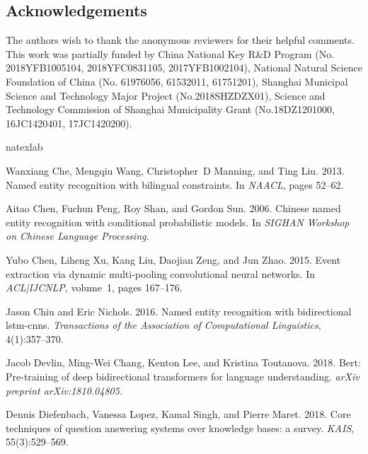 \documentclass[11pt,a4paper]{article}
\begin{document}
\begin{CJK}{UTF8}{gbsn}
\section*{Acknowledgements}
The authors wish to thank the anonymous reviewers for their helpful comments. This work was partially funded by China National Key R\&D Program (No. 2018YFB1005104, 2018YFC0831105, 2017YFB1002104), National Natural Science Foundation of China (No. 61976056, 61532011, 61751201), Shanghai Municipal Science and Technology Major Project (No.2018SHZDZX01), Science and Technology Commission of Shanghai Municipality Grant  (No.18DZ1201000, 16JC1420401, 17JC1420200).

\begin{thebibliography}{35}
\expandafter\ifx\csname natexlab\endcsname\relax\def\natexlab#1{#1}\fi

Wanxiang Che, Mengqiu Wang, Christopher~D Manning, and Ting Liu. 2013.
\newblock Named entity recognition with bilingual constraints.
\newblock In \emph{NAACL}, pages 52--62.

Aitao Chen, Fuchun Peng, Roy Shan, and Gordon Sun. 2006.
\newblock Chinese named entity recognition with conditional probabilistic
  models.
\newblock In \emph{SIGHAN Workshop on Chinese Language Processing}.

Yubo Chen, Liheng Xu, Kang Liu, Daojian Zeng, and Jun Zhao. 2015.
\newblock Event extraction via dynamic multi-pooling convolutional neural
  networks.
\newblock In \emph{ACL|IJCNLP}, volume~1, pages 167--176.

Jason Chiu and Eric Nichols. 2016.
\newblock Named entity recognition with bidirectional lstm-cnns.
\newblock \emph{Transactions of the Association of Computational Linguistics},
  4(1):357--370.

Jacob Devlin, Ming-Wei Chang, Kenton Lee, and Kristina Toutanova. 2018.
\newblock Bert: Pre-training of deep bidirectional transformers for language
  understanding.
\newblock \emph{arXiv preprint arXiv:1810.04805}.

Dennis Diefenbach, Vanessa Lopez, Kamal Singh, and Pierre Maret. 2018.
\newblock Core techniques of question answering systems over knowledge bases: a
  survey.
\newblock \emph{KAIS}, 55(3):529--569.


\end{thebibliography}
\end{CJK}
\end{document}
